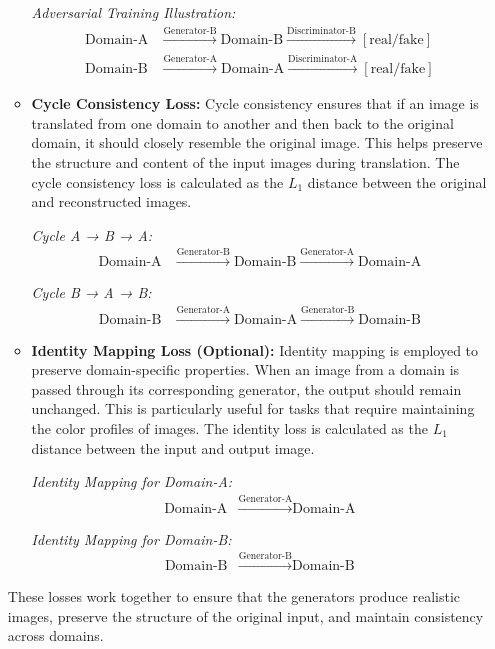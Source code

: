 \documentclass[12pt,DIV14,BCOR12mm,a4paper,footinclude=false,headinclude,parskip=half-,twoside,openright,cleardoublepage=empty,toc=index,bibliography=totoc,listof=totoc]{scrreprt}
\numberwithin{equation}{chapter}
\begin{document}
\begin{enumerate}
\begin{itemize}
				\textit{Adversarial Training Illustration:}
				\begin{align*}
				\text{Domain-A} & \xrightarrow{\text{Generator-B}} \text{Domain-B} \xrightarrow{\text{Discriminator-B}} [\text{real/fake}] \\
				\text{Domain-B} & \xrightarrow{\text{Generator-A}} \text{Domain-A} \xrightarrow{\text{Discriminator-A}} [\text{real/fake}]
				\end{align*}

				\item \textbf{Cycle Consistency Loss:} Cycle consistency ensures that if an image is translated from one domain to another and then back to the original domain, it should closely resemble the original image. This helps preserve the structure and content of the input images during translation. The cycle consistency loss is calculated as the $L_1$ distance between the original and reconstructed images.

				\textit{Cycle A → B → A:}
				\begin{align*}
				\text{Domain-A} & \xrightarrow{\text{Generator-B}} \text{Domain-B} \xrightarrow{\text{Generator-A}} \text{Domain-A}
				\end{align*}

				\textit{Cycle B → A → B:}
				\begin{align*}
				\text{Domain-B} & \xrightarrow{\text{Generator-A}} \text{Domain-A} \xrightarrow{\text{Generator-B}} \text{Domain-B}
				\end{align*}

				\item \textbf{Identity Mapping Loss (Optional):} Identity mapping is employed to preserve domain-specific properties. When an image from a domain is passed through its corresponding generator, the output should remain unchanged. This is particularly useful for tasks that require maintaining the color profiles of images. The identity loss is calculated as the $L_1$ distance between the input and output image.

				\textit{Identity Mapping for Domain-A:}
				\begin{align*}
				\text{Domain-A} & \xrightarrow{\text{Generator-A}} \text{Domain-A}
				\end{align*}

				\textit{Identity Mapping for Domain-B:}
				\begin{align*}
				\text{Domain-B} & \xrightarrow{\text{Generator-B}} \text{Domain-B}
				\end{align*}
		\end{itemize}

		These losses work together to ensure that the generators produce realistic images, preserve the structure of the original input, and maintain consistency across domains.
\end{enumerate}
\end{document}
